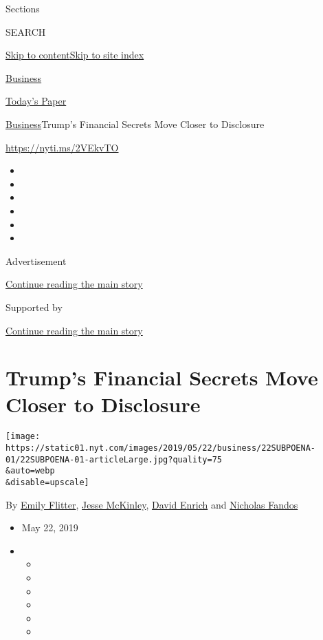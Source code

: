 Sections

SEARCH

\protect\hyperlink{site-content}{Skip to
content}\protect\hyperlink{site-index}{Skip to site index}

\href{https://www.nytimes.com/section/business}{Business}

\href{https://myaccount.nytimes.com/auth/login?response_type=cookie\&client_id=vi}{}

\href{https://www.nytimes.com/section/todayspaper}{Today's Paper}

\href{/section/business}{Business}\textbar{}Trump's Financial Secrets
Move Closer to Disclosure

\url{https://nyti.ms/2VEkvTO}

\begin{itemize}
\item
\item
\item
\item
\item
\item
\end{itemize}

Advertisement

\protect\hyperlink{after-top}{Continue reading the main story}

Supported by

\protect\hyperlink{after-sponsor}{Continue reading the main story}

\hypertarget{trumps-financial-secrets-move-closer-to-disclosure}{%
\section{Trump's Financial Secrets Move Closer to
Disclosure}\label{trumps-financial-secrets-move-closer-to-disclosure}}

\texttt{[image: https://static01.nyt.com/images/2019/05/22/business/22SUBPOENA-01/22SUBPOENA-01-articleLarge.jpg?quality=75\\\&auto=webp\\\&disable=upscale]}

By \href{https://www.nytimes.com/by/emily-flitter}{Emily Flitter},
\href{https://www.nytimes.com/by/jesse-mckinley}{Jesse McKinley},
\href{https://www.nytimes.com/by/david-enrich}{David Enrich} and
\href{https://www.nytimes.com/by/nicholas-fandos}{Nicholas Fandos}

\begin{itemize}
\item
  May 22, 2019
\item
  \begin{itemize}
  \item
  \item
  \item
  \item
  \item
  \item
  \end{itemize}
\end{itemize}

